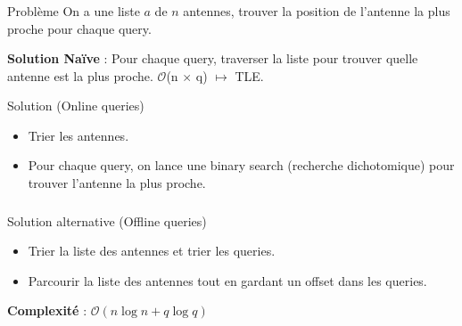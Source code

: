\begin{frame}
    \frametitle{\problemtitle}
    \begin{block}{Problème}
        On a une liste $a$ de $n$ antennes, trouver la position de l'antenne la plus proche pour chaque query.
    \end{block}
    \pause
    \textbf{Solution Naïve} : Pour chaque query, traverser la liste pour trouver quelle antenne est la plus proche.
    \pause
    $\mathcal{O}$(n $\times$ q) $\mapsto$ TLE.\\
    \pause \vspace{1em}
    \begin{block}{Solution (Online queries)}
        \begin{itemize}
            \item<+-> Trier les antennes.
            \item<+-> Pour chaque query, on lance une binary search (recherche dichotomique) pour trouver l'antenne la plus proche.
        \end{itemize}
    \end{block}
\end{frame}

\begin{frame}
    \frametitle{\problemtitle}
    \begin{block}{Solution alternative (Offline queries)}
        \begin{itemize}
            \item Trier la liste des antennes et trier les queries.
            \item Parcourir la liste des antennes tout en gardant un offset dans les queries.
        \end{itemize}
        \pause
        \textbf{Complexité} : $\mathcal{O}(n \log n + q\log q)$
    \end{block}

    \solvestats
\end{frame}